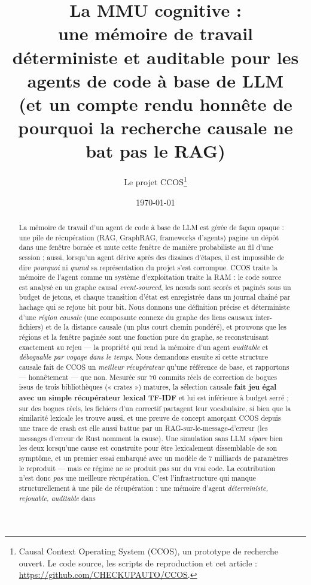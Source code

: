 \documentclass[11pt]{article}
\title{\textbf{La MMU cognitive :\\ une mémoire de travail déterministe et auditable pour les agents de code à base de LLM\\ \large (et un compte rendu honnête de pourquoi la recherche causale ne bat pas le RAG)}}
\author{Le projet CCOS\thanks{Causal Context Operating System (CCOS), un prototype
de recherche ouvert. Le code source, les scripts de reproduction et cet article :
\url{https://github.com/CHECKUPAUTO/CCOS}.}}
\date{\today}
\begin{document}
\maketitle

\begin{abstract}
La mémoire de travail d'un agent de code à base de LLM est gérée de façon opaque :
une pile de récupération (RAG, GraphRAG, frameworks d'agents) pagine un dépôt dans
une fenêtre bornée et mute cette fenêtre de manière probabiliste au fil d'une
session ; aussi, lorsqu'un agent dérive après des dizaines d'étapes, il est
impossible de dire \emph{pourquoi} ni \emph{quand} sa représentation du projet
s'est corrompue. CCOS traite la mémoire de l'agent comme un système d'exploitation
traite la RAM : le code source est analysé en un graphe causal \emph{event-sourced},
les nœuds sont scorés et paginés sous un budget de jetons, et chaque transition
d'état est enregistrée dans un journal chaîné par hachage qui se rejoue bit pour
bit. Nous donnons une définition précise et déterministe d'une \emph{région causale}
(une composante connexe du graphe des liens causaux inter-fichiers) et de la
distance causale (un plus court chemin pondéré), et prouvons que les régions et la
fenêtre paginée sont une fonction pure du graphe, se reconstruisant exactement au
rejeu --- la propriété qui rend la mémoire d'un agent \emph{auditable} et
\emph{déboguable par voyage dans le temps}. Nous demandons ensuite si cette structure
causale fait de CCOS un \emph{meilleur récupérateur} qu'une référence de base, et
rapportons --- honnêtement --- que non. Mesurée sur $70$ commits réels de correction
de bogues issus de trois bibliothèques (« crates ») matures, la sélection causale
\textbf{fait jeu égal avec un simple récupérateur lexical TF-IDF} et lui est
inférieure à budget serré ; sur des bogues réels, les fichiers d'un correctif
partagent leur vocabulaire, si bien que la similarité lexicale les trouve aussi, et
une preuve de concept amorçant CCOS depuis une trace de crash est elle aussi battue
par un RAG-sur-le-message-d'erreur (les messages d'erreur de Rust nomment la cause).
Une simulation sans LLM \emph{sépare} bien les deux lorsqu'une cause est construite
pour être lexicalement dissemblable de son symptôme, et un premier essai embarqué
avec un modèle de $7$ milliards de paramètres le reproduit --- mais ce régime ne se
produit pas sur du vrai code. La contribution n'est donc \emph{pas} une meilleure
récupération. C'est l'infrastructure qui manque structurellement à une pile de
récupération : une mémoire d'agent \emph{déterministe, rejouable, auditable} dans

\end{abstract}
\end{document}
